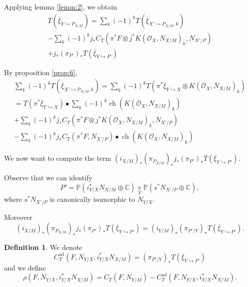 \documentclass[10pt,twoside]{article}
\numberwithin{equation}{section}
\theoremstyle{plain}
\theoremstyle{definition}
\newtheorem{definition}[equation]{Definition}
\DeclareMathOperator{\ch}{ch}
\DeclareMathOperator{\ad}{ad}
\begin{document}
Applying lemma \ref{lemm:2}, we obtain
\begin{multline}
  T(\overline \xi_{Y\hookrightarrow P_{X/M}})=  \sum_{k}(-1)^{k}T(\overline \xi
_{X'\hookrightarrow P_{X/M},k})\\
- \sum_{k}(-1)^{k}j_{\ast}C_{T}(\pi ^{\ast} F\otimes
j^{\ast}K(\mathcal{O}_{X},N_{X/M})_{k},N_{X'/P}) \\
+j_{\ast}(\pi _{P'})_{\ast}T(\overline \xi _{Y\hookrightarrow P'})\label{eq:27} 
\end{multline}

By proposition \ref{prop:6}, 
\begin{multline} \label{eq:26}
  \sum_{k}(-1)^{k}T(\overline \xi
  _{X'\hookrightarrow P_{X/M},k})=\sum_{k}(-1)^{k}
  T(\pi ^{\ast}\overline \xi_{Y\hookrightarrow
    X}\otimes K(\overline {\mathcal{O}}_{X},\overline N_{X/M})_{k})\\
  =T(\pi ^{\ast}\overline \xi_{Y\hookrightarrow
    X})\bullet \sum_{k}(-1)^{k}\ch(K(\overline
  {\mathcal{O}}_{X},\overline N_{X/M})_{k})\\ 
  +\sum_{k}(-1)^{k} j_{\ast}C_{T}(\pi ^{\ast} F\otimes
  j^{\ast}K(\mathcal{O}_{X},N_{X/M})_{k}, N_{X'/P})\\
  -\sum_{k}(-1)^{k} j_{\ast}C_{T}(\pi ^{\ast} F, N_{X'/P})\bullet 
  \ch(K(\mathcal{O}_{X},N_{X/M})_{k}) 
\end{multline}

We now want to compute the term $ (i_{X/M})_{\ast}(\pi
_{P_{X/M}})_{\ast}j_{\ast}(\pi 
_{P'})_{\ast}T(\overline \xi _{Y\hookrightarrow P'})$. 

Observe that we can identify
\begin{displaymath}
  P'= \mathbb{P}(i_{Y/X}^{\ast}N_{X/M}\oplus
  \mathbb{C})\underset{Y}{\times} 
  \mathbb{P}(s^{\ast}N_{X'/P}\oplus
  \mathbb{C}),
\end{displaymath}
where $s^{\ast}N_{X'/P}$ is canonically isomorphic to $N_{Y/X}$.
 
Moreover 
\begin{displaymath}
  (i_{X/M})_{\ast}(\pi
_{P_{X/M}})_{\ast}j_{\ast}(\pi 
_{P'})_{\ast}T(\overline \xi _{Y\hookrightarrow P'})=
(i_{Y/M})_{\ast}(\pi _{P'/Y})_{\ast}T(\overline \xi _{Y\hookrightarrow P'}).
\end{displaymath}

\begin{definition}\label{def:10}
  We denote
  \begin{displaymath}
    C_{T}^{\ad}(F,N_{Y/X},i_{Y/X}^{\ast}N_{X/M})=(\pi _{P'/Y})_{\ast}T(\overline \xi
    _{Y\hookrightarrow P'}) 
  \end{displaymath}
  and we define
  \begin{equation}
    \label{eq:47}
    \rho (F,N_{Y/X},i_{Y/X}^{\ast}N_{X/M})=
    C_{T}(F,N_{Y/M})-C_{T}^{\ad}(F,N_{Y/X},i_{Y/X}^{\ast}N_{X/M}).
  \end{equation}
\end{definition}
\end{document}
